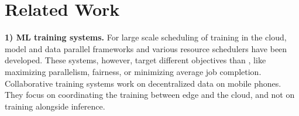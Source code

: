 
\section{Related Work}
\label{sec:related_work}


















\noindent\textbf{1) ML training systems.} %
For large scale scheduling of training in the cloud, model and data parallel frameworks \cite{DBLP:conf/nips/DeanCMCDLMRSTYN12, DBLP:journals/pvldb/LowGKBGH12, 199317, mxnet} %
and various resource schedulers \cite{DBLP:journals/corr/abs-1907-01484, DBLP:conf/osdi/XiaoBRSKHPPZZYZ18, DBLP:conf/nsdi/GuCSZJQLG19, DBLP:conf/eurosys/PengBCWG18, DBLP:conf/sigcomm/GrandlAKRA14, DBLP:conf/cloud/ZhangSOF17} %
have been developed. These systems, however, target different objectives than {\name}, like maximizing parallelism, fairness, or minimizing average job completion. %
Collaborative training systems \cite{DBLP:journals/corr/abs-1902-01046, DBLP:conf/edge/LuSTLZCP19} work on decentralized data on mobile phones. They focus on coordinating the training between edge and the cloud, and not on training alongside inference.

